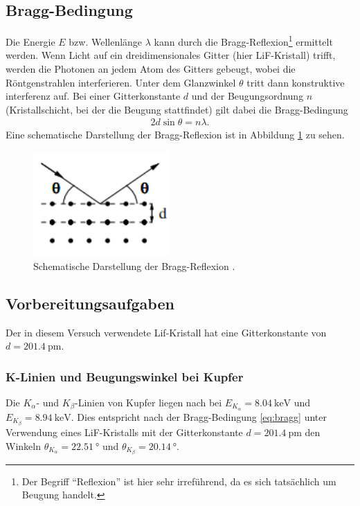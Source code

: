 \subsection{Bragg-Bedingung}
Die Energie $E$ bzw. Wellenlänge $\lambda$ kann durch die Bragg-Reflexion\footnote[2]{Der Begriff \enquote{Reflexion} ist hier sehr irreführend, da es sich tatsächlich um Beugung handelt.}
ermittelt werden.
Wenn Licht auf ein dreidimensionales Gitter (hier LiF-Kristall) trifft,
werden die Photonen an jedem Atom des Gitters gebeugt, wobei die Röntgenstrahlen interferieren.
Unter dem Glanzwinkel $\theta$ tritt dann konstruktive interferenz auf.
Bei einer Gitterkonstante $d$ und der Beugungsordnung $n$ (Kristallschicht, bei der die Beugung stattfindet) gilt dabei die Bragg-Bedingung
\begin{align}
    2 d \sin \theta = n \lambda.
    \label{eq:bragg}
\end{align}
Eine schematische Darstellung der Bragg-Reflexion ist in Abbildung \ref{fig:bragg} zu sehen.

\begin{figure}[H]
    \centering
    \includegraphics[height = 4cm]{Abbildungen/bragg.png}
    \caption[]{Schematische Darstellung der Bragg-Reflexion \cite[]{man:v602}.}
    \label{fig:bragg}
\end{figure}


\subsection{Vorbereitungsaufgaben}
Der in diesem Versuch verwendete Lif-Kristall hat eine Gitterkonstante von $d = \qty[]{201.4}{\pico\meter}$.

\subsubsection[]{K-Linien und Beugungswinkel bei Kupfer}
Die $K_\alpha$- und $K_\beta$-Linien von Kupfer liegen nach \cite[]{roentgen_leifi} bei $E_{K_\alpha} = \qty[]{8.04}{\kilo\electronvolt}$
und $E_{K_\beta} = \qty[]{8.94}{\kilo\electronvolt}$.
Dies entspricht nach der Bragg-Bedingung \eqref{eq:bragg} unter Verwendung eines LiF-Kristalls mit der Gitterkonstante $d = \qty[]{201.4}{\pico\meter}$
den Winkeln $\theta_{K_\alpha} = \qty[]{22.51}{\degree}$ und $\theta_{K_\beta} = \qty[]{20.14}{\degree}$.



